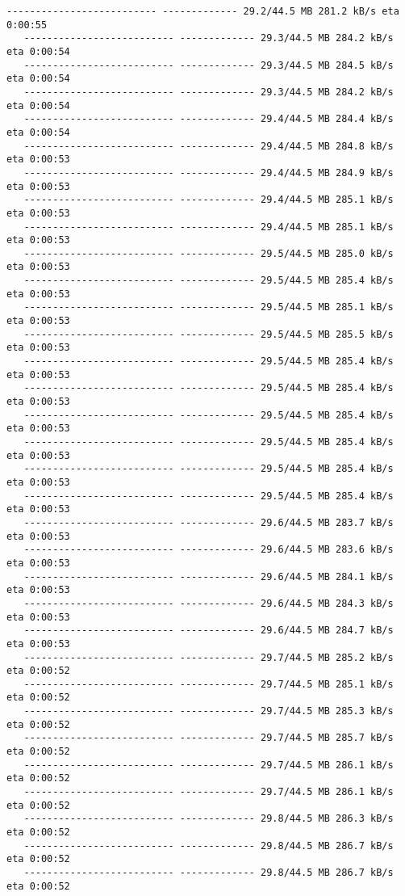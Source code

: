 \documentclass[11pt]{article}
\begin{document}
\begin{Verbatim}[commandchars=\\\{\}]
   -------------------------- ------------- 29.2/44.5 MB 281.2 kB/s eta 0:00:55
   -------------------------- ------------- 29.3/44.5 MB 284.2 kB/s eta 0:00:54
   -------------------------- ------------- 29.3/44.5 MB 284.5 kB/s eta 0:00:54
   -------------------------- ------------- 29.3/44.5 MB 284.2 kB/s eta 0:00:54
   -------------------------- ------------- 29.4/44.5 MB 284.4 kB/s eta 0:00:54
   -------------------------- ------------- 29.4/44.5 MB 284.8 kB/s eta 0:00:53
   -------------------------- ------------- 29.4/44.5 MB 284.9 kB/s eta 0:00:53
   -------------------------- ------------- 29.4/44.5 MB 285.1 kB/s eta 0:00:53
   -------------------------- ------------- 29.4/44.5 MB 285.1 kB/s eta 0:00:53
   -------------------------- ------------- 29.5/44.5 MB 285.0 kB/s eta 0:00:53
   -------------------------- ------------- 29.5/44.5 MB 285.4 kB/s eta 0:00:53
   -------------------------- ------------- 29.5/44.5 MB 285.1 kB/s eta 0:00:53
   -------------------------- ------------- 29.5/44.5 MB 285.5 kB/s eta 0:00:53
   -------------------------- ------------- 29.5/44.5 MB 285.4 kB/s eta 0:00:53
   -------------------------- ------------- 29.5/44.5 MB 285.4 kB/s eta 0:00:53
   -------------------------- ------------- 29.5/44.5 MB 285.4 kB/s eta 0:00:53
   -------------------------- ------------- 29.5/44.5 MB 285.4 kB/s eta 0:00:53
   -------------------------- ------------- 29.5/44.5 MB 285.4 kB/s eta 0:00:53
   -------------------------- ------------- 29.5/44.5 MB 285.4 kB/s eta 0:00:53
   -------------------------- ------------- 29.6/44.5 MB 283.7 kB/s eta 0:00:53
   -------------------------- ------------- 29.6/44.5 MB 283.6 kB/s eta 0:00:53
   -------------------------- ------------- 29.6/44.5 MB 284.1 kB/s eta 0:00:53
   -------------------------- ------------- 29.6/44.5 MB 284.3 kB/s eta 0:00:53
   -------------------------- ------------- 29.6/44.5 MB 284.7 kB/s eta 0:00:53
   -------------------------- ------------- 29.7/44.5 MB 285.2 kB/s eta 0:00:52
   -------------------------- ------------- 29.7/44.5 MB 285.1 kB/s eta 0:00:52
   -------------------------- ------------- 29.7/44.5 MB 285.3 kB/s eta 0:00:52
   -------------------------- ------------- 29.7/44.5 MB 285.7 kB/s eta 0:00:52
   -------------------------- ------------- 29.7/44.5 MB 286.1 kB/s eta 0:00:52
   -------------------------- ------------- 29.7/44.5 MB 286.1 kB/s eta 0:00:52
   -------------------------- ------------- 29.8/44.5 MB 286.3 kB/s eta 0:00:52
   -------------------------- ------------- 29.8/44.5 MB 286.7 kB/s eta 0:00:52
   -------------------------- ------------- 29.8/44.5 MB 286.7 kB/s eta 0:00:52

\end{Verbatim}
\end{document}
